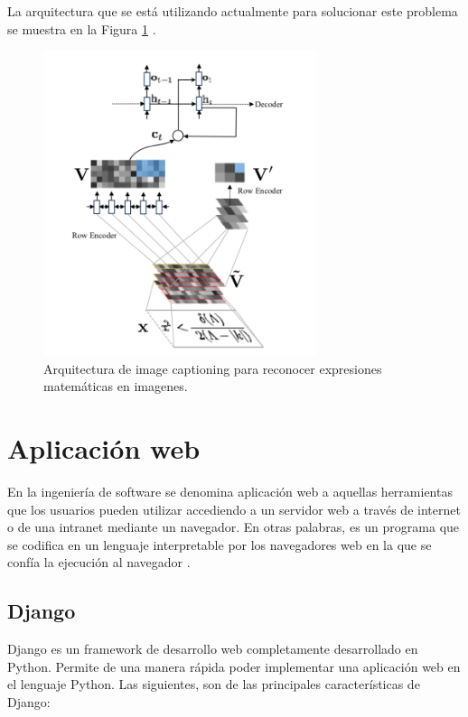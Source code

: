 La arquitectura que se está utilizando actualmente para solucionar este problema se muestra en la Figura \ref{fig:imgcaptioning} \cite{imagetolatex}\cite{imagemarkup}\cite{chino}.

\begin{figure}
	\centering
	\includegraphics[width=8cm]{capitulo2/images/imgcaptioning}
	\caption{Arquitectura de image captioning para reconocer expresiones matemáticas en imagenes.}
	\label{fig:imgcaptioning}
\end{figure}


\section{Aplicación web}
En la ingeniería de software se denomina aplicación web a aquellas herramientas que los usuarios pueden utilizar accediendo a un servidor web a través de internet o de una intranet mediante un navegador. En otras palabras, es un programa que se codifica en un lenguaje interpretable por los navegadores web en la que se confía la ejecución al navegador \cite{appweb}.

\subsection{Django}
Django es un framework de desarrollo web completamente desarrollado en Python. Permite de una manera rápida poder implementar una aplicación web en el lenguaje Python. Las siguientes, son de las principales características de Django:

